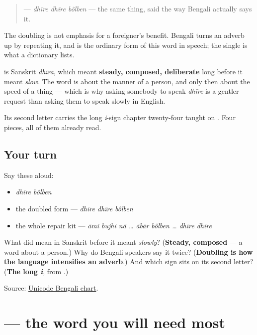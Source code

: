 \begin{quote}
\textbf{  } — \emph{dhīre dhīre bôlben} — the same thing, said the way Bengali actually says it.
\end{quote}

The doubling is not emphasis for a foreigner's benefit. Bengali turns an adverb up by repeating it, and \textbf{ } is the ordinary form of this word in speech; the single \textbf{} is what a dictionary lists.

\begin{cousinweb}
\textbf{} is Sanskrit \emph{dhīra}, which meant \textbf{steady, composed, deliberate} long before it meant \emph{slow}. The word is about the manner of a person, and only then about the speed of a thing — which is why asking somebody to speak \emph{dhīre} is a gentler request than asking them to speak slowly in English.

Its second letter carries the long \emph{i}-sign chapter twenty-four taught on \textbf{}. Four pieces, all of them already read.
\end{cousinweb}

\subsection*{Your turn}
Say these aloud:

\begin{itemize}
\raggedright
  \item \emph{dhīre bôlben}
  \item the doubled form — \emph{dhīre dhīre bôlben}
  \item the whole repair kit — \emph{āmi bujhi nā … ābār bôlben … dhīre dhīre}
\end{itemize}

\begin{tcolorbox}[breakable,colback=teal!4,colframe=teal!35!black,title={Before you move on}]
What did \textbf{} mean in Sanskrit before it meant \emph{slowly}? (\textbf{Steady, composed} — a word about a person.) Why do Bengali speakers say it twice? (\textbf{Doubling is how the language intensifies an adverb}.) And which sign sits on its second letter? (\textbf{The long \emph{i}}, from \textbf{}.)

Source: \href{https://www.unicode.org/charts/PDF/U0980.pdf}{Unicode Bengali chart}.
\end{tcolorbox}
\section[\texorpdfstring{\bn{ধীরে} (dhīre)}{ধীরে (dhīre)}]{ — the word you will need most}

